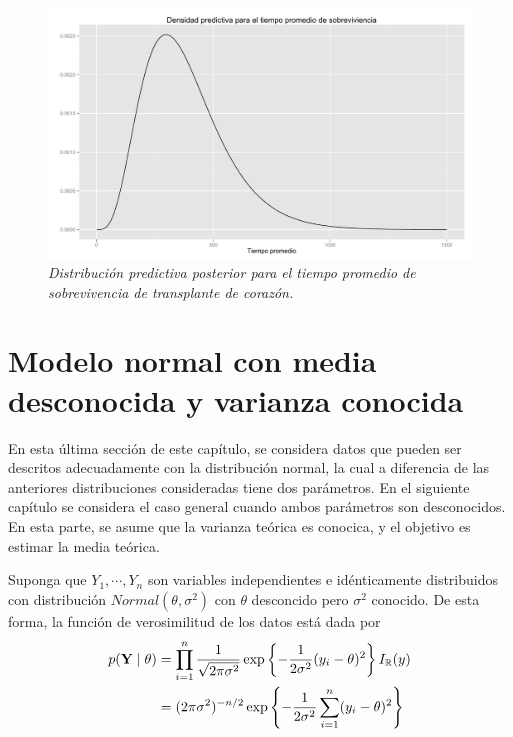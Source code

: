     \begin{figure}[!h]
    \centering
    \includegraphics[scale=0.4]{predexponencial.pdf}
    \caption{\emph{Distribuci\'on predictiva posterior para el tiempo promedio de sobrevivencia de transplante de coraz\'on.}}
    \label{pred_post_expo_eje}
    \end{figure}
    
    \section{Modelo normal con media desconocida y varianza conocida}
    
    En esta \'ultima secci\'on de este cap\'itulo, se considera datos que pueden ser descritos adecuadamente con la distribuci\'on normal, la cual a diferencia de las anteriores distribuciones consideradas tiene dos par\'ametros. En el siguiente cap\'itulo se considera el caso general cuando ambos par\'ametros son desconocidos. En esta parte, se asume que la varianza te\'orica es conocica, y el objetivo es estimar la media te\'orica.
    
    Suponga que $Y_1,\cdots,Y_n$ son variables independientes e id\'enticamente distribuidos con distribuci\'on $Normal(\theta,\sigma^2)$ con $\theta$ desconcido pero $\sigma^2$ conocido. De esta forma, la funci\'on de verosimilitud de los datos est\'a dada por
    \begin{align}
    \label{vero_normal}
    p(\mathbf{Y} \mid \theta)&=\prod_{i=1}^n\frac{1}{\sqrt{2\pi\sigma^2}}\exp\left\{-\frac{1}{2\sigma^2}(y_i-\theta)^2\right\}I_\mathbb{R}(y)\notag\\
    &=(2\pi\sigma^2)^{-n/2}\exp\left\{-\frac{1}{2\sigma^2}\sum_{i=1}^n(y_i-\theta)^2\right\}
    \end{align}
    

